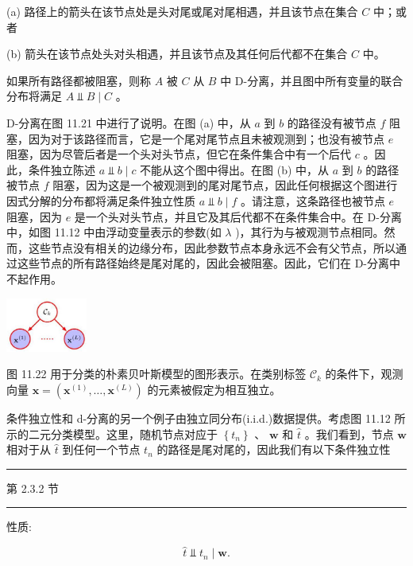 \documentclass[10pt]{report}
\newcommand{\HRule}{\begin{center}\rule{0.9\linewidth}{0.2mm}\end{center}}
\begin{document}
(a) 路径上的箭头在该节点处是头对尾或尾对尾相遇，并且该节点在集合 \(C\) 中；或者

(b) 箭头在该节点处头对头相遇，并且该节点及其任何后代都不在集合 \(C\) 中。

如果所有路径都被阻塞，则称 \(A\) 被 \(C\) 从 \(B\) 中 D-分离，并且图中所有变量的联合分布将满足 \(A ⫫ B \mid  C\) 。

D-分离在图 11.21 中进行了说明。在图 (a) 中，从 \(a\) 到 \(b\) 的路径没有被节点 \(f\) 阻塞，因为对于该路径而言，它是一个尾对尾节点且未被观测到；也没有被节点 \(e\) 阻塞，因为尽管后者是一个头对头节点，但它在条件集合中有一个后代 \(c\) 。因此，条件独立陈述 \(a ⫫ b \mid  c\) 不能从这个图中得出。在图 (b) 中，从 \(a\) 到 \(b\) 的路径被节点 \(f\) 阻塞，因为这是一个被观测到的尾对尾节点，因此任何根据这个图进行因式分解的分布都将满足条件独立性质 \(a ⫫ b \mid  f\) 。请注意，这条路径也被节点 \(e\) 阻塞，因为 \(e\) 是一个头对头节点，并且它及其后代都不在条件集合中。在 D-分离中，如图 11.12 中由浮动变量表示的参数(如 \(\lambda\) )，其行为与被观测节点相同。然而，这些节点没有相关的边缘分布，因此参数节点本身永远不会有父节点，所以通过这些节点的所有路径始终是尾对尾的，因此会被阻塞。因此，它们在 D-分离中不起作用。

\begin{center}
\includegraphics[max width=0.2\textwidth]{images/0194e279-9b28-703a-88f4-c3ac21e2010d_363_1261_346_292_195_0.jpg}
\end{center}
\hspace*{3em} 

图 11.22 用于分类的朴素贝叶斯模型的图形表示。在类别标签 \({\mathcal{C}}_{k}\) 的条件下，观测向量 \(\mathbf{x} = \left( {{\mathbf{x}}^{\left( 1\right) },\ldots ,{\mathbf{x}}^{\left( L\right) }}\right)\) 的元素被假定为相互独立。

条件独立性和 d-分离的另一个例子由独立同分布(i.i.d.)数据提供。考虑图 11.12 所示的二元分类模型。这里，随机节点对应于 \(\left\{  {t}_{n}\right\}\) 、 \(\mathbf{w}\) 和 \(\widehat{t}\) 。我们看到，节点 \(\mathbf{w}\) 相对于从 \(\widehat{t}\) 到任何一个节点 \({t}_{n}\) 的路径是尾对尾的，因此我们有以下条件独立性

\HRule

第 2.3.2 节

\HRule

性质:

\[
\widehat{t} ⫫ {t}_{n} \mid  \mathbf{w}. \tag{11.36}
\]
\end{document}
